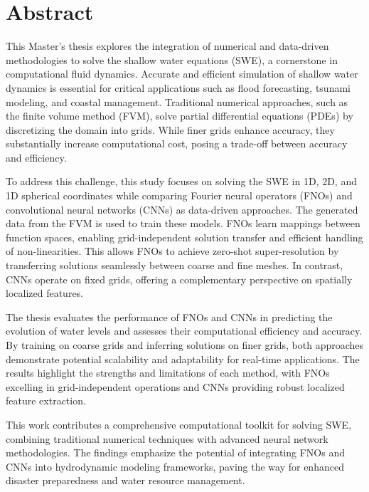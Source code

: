 \chapter*{Abstract}

This Master's thesis explores the integration of numerical and data-driven methodologies to solve the shallow water equations (SWE), a cornerstone in computational fluid dynamics.
Accurate and efficient simulation of shallow water dynamics is essential for critical applications such as flood forecasting, tsunami modeling, and coastal management.
Traditional numerical approaches, such as the finite volume method (FVM), solve partial differential equations (PDEs) by discretizing the domain into grids.
While finer grids enhance accuracy, they substantially increase computational cost, posing a trade-off between accuracy and efficiency.

\noindent To address this challenge, this study focuses on solving the SWE in 1D, 2D, and 1D spherical coordinates while comparing Fourier neural operators (FNOs) and convolutional neural networks (CNNs) as data-driven approaches.
The generated data from the FVM is used to train these models.
FNOs learn mappings between function spaces, enabling grid-independent solution transfer and efficient handling of non-linearities.
This allows FNOs to achieve zero-shot super-resolution by transferring solutions seamlessly between coarse and fine meshes.
In contrast, CNNs operate on fixed grids, offering a complementary perspective on spatially localized features.

\noindent The thesis evaluates the performance of FNOs and CNNs in predicting the evolution of water levels and assesses their computational efficiency and accuracy.
By training on coarse grids and inferring solutions on finer grids, both approaches demonstrate potential scalability and adaptability for real-time applications.
The results highlight the strengths and limitations of each method, with FNOs excelling in grid-independent operations and CNNs providing robust localized feature extraction.

\noindent This work contributes a comprehensive computational toolkit for solving SWE, combining traditional numerical techniques with advanced neural network methodologies.
The findings emphasize the potential of integrating FNOs and CNNs into hydrodynamic modeling frameworks, paving the way for enhanced disaster preparedness and water resource management.





